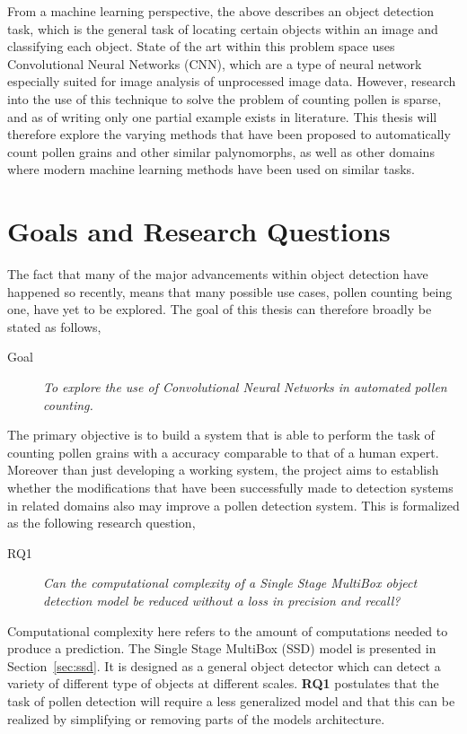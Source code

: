 From a machine learning perspective, the above describes an object detection task, which is the general task of locating certain objects within an image and classifying each object.
State of the art within this problem space uses Convolutional Neural Networks (CNN), which are a type of neural network especially suited for image analysis of unprocessed image data.
However, research into the use of this technique to solve the problem of counting pollen is sparse, and as of writing only one partial example exists in literature.
This thesis will therefore explore the varying methods that have been proposed to automatically count pollen grains and other similar palynomorphs, as well as other domains where modern machine learning methods have been used on similar tasks.

\section{Goals and Research Questions}\label{sec:Goals and Research Questions}
The fact that many of the major advancements within object detection have happened so recently, means that many possible use cases, pollen counting being one, have yet to be explored.
The goal of this thesis can therefore broadly be stated as follows,

\begin{description}
\item[Goal] \textit{To explore the use of Convolutional Neural Networks in automated pollen counting.}
\end{description}

The primary objective is to build a system that is able to perform the task of counting pollen grains with a accuracy comparable to that of a human expert.
Moreover than just developing a working system, the project aims to establish whether the modifications that have been successfully made to detection systems in related domains also may improve a pollen detection system.
This is formalized as the following research question, 

\begin{description}
\item[RQ1] \textit{Can the computational complexity of a Single Stage MultiBox object detection model be reduced without a loss in precision and recall?}
\end{description}

Computational complexity here refers to the amount of computations needed to produce a prediction.
The Single Stage MultiBox (SSD) model is presented in Section~\ref{sec:ssd}.
It is designed as a general object detector which can detect a variety of different type of objects at different scales.
\textbf{RQ1} postulates that the task of pollen detection will require a less generalized model and that this can be realized by simplifying or removing parts of the models architecture.
 
